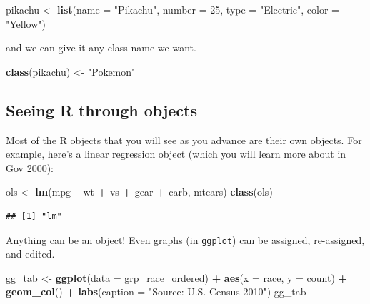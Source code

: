 \documentclass[]{book}
\newenvironment{Shaded}{\begin{snugshade}}{\end{snugshade}}
\newcommand{\KeywordTok}[1]{\textcolor[rgb]{0.13,0.29,0.53}{\textbf{#1}}}
\newcommand{\DataTypeTok}[1]{\textcolor[rgb]{0.13,0.29,0.53}{#1}}
\newcommand{\DecValTok}[1]{\textcolor[rgb]{0.00,0.00,0.81}{#1}}
\newcommand{\StringTok}[1]{\textcolor[rgb]{0.31,0.60,0.02}{#1}}
\newcommand{\OperatorTok}[1]{\textcolor[rgb]{0.81,0.36,0.00}{\textbf{#1}}}
\newcommand{\NormalTok}[1]{#1}
\theoremstyle{definition}
\theoremstyle{definition}
\theoremstyle{definition}
\theoremstyle{remark}
\begin{document}
\begin{Shaded}
\begin{Highlighting}[]
\NormalTok{pikachu <-}\StringTok{ }\KeywordTok{list}\NormalTok{(}\DataTypeTok{name =} \StringTok{"Pikachu"}\NormalTok{,}
                \DataTypeTok{number =} \DecValTok{25}\NormalTok{,}
                \DataTypeTok{type =} \StringTok{"Electric"}\NormalTok{,}
                \DataTypeTok{color =} \StringTok{"Yellow"}\NormalTok{)}
\end{Highlighting}
\end{Shaded}

and we can give it any class name we want.

\begin{Shaded}
\begin{Highlighting}[]
\KeywordTok{class}\NormalTok{(pikachu) <-}\StringTok{ "Pokemon"}
\end{Highlighting}
\end{Shaded}

\subsection{Seeing R through objects}\label{seeing-r-through-objects}

Most of the R objects that you will see as you advance are their own
objects. For example, here's a linear regression object (which you will
learn more about in Gov 2000):

\begin{Shaded}
\begin{Highlighting}[]
\NormalTok{ols <-}\StringTok{ }\KeywordTok{lm}\NormalTok{(mpg }\OperatorTok{~}\StringTok{ }\NormalTok{wt }\OperatorTok{+}\StringTok{ }\NormalTok{vs }\OperatorTok{+}\StringTok{ }\NormalTok{gear }\OperatorTok{+}\StringTok{ }\NormalTok{carb, mtcars)}
\KeywordTok{class}\NormalTok{(ols)}
\end{Highlighting}
\end{Shaded}

\begin{verbatim}
## [1] "lm"
\end{verbatim}

Anything can be an object! Even graphs (in \texttt{ggplot}) can be
assigned, re-assigned, and edited.

\begin{Shaded}
\begin{Highlighting}[]
\NormalTok{gg_tab <-}\StringTok{ }\KeywordTok{ggplot}\NormalTok{(}\DataTypeTok{data =}\NormalTok{ grp_race_ordered) }\OperatorTok{+}
\StringTok{  }\KeywordTok{aes}\NormalTok{(}\DataTypeTok{x =}\NormalTok{ race, }\DataTypeTok{y =}\NormalTok{ count) }\OperatorTok{+}
\StringTok{  }\KeywordTok{geom_col}\NormalTok{() }\OperatorTok{+}
\StringTok{  }\KeywordTok{labs}\NormalTok{(}\DataTypeTok{caption =} \StringTok{"Source: U.S. Census 2010"}\NormalTok{)}
\NormalTok{gg_tab}
\end{Highlighting}
\end{Shaded}
\end{document}
